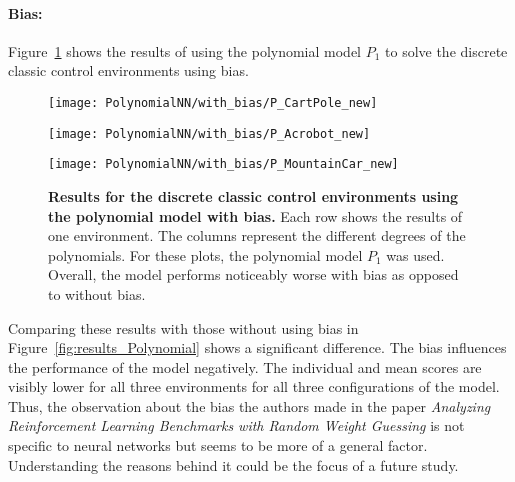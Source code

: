 \paragraph*{Bias:} Figure~\ref{fig:results_Polynomial_bias} shows the results of using the polynomial model $P_1$ to solve the discrete classic control environments using bias.
\begin{figure}[!ht]
  \centering
  \texttt{[image: PolynomialNN/with\_bias/P\_CartPole\_new]}

      \vspace{0.2cm}

  \texttt{[image: PolynomialNN/with\_bias/P\_Acrobot\_new]}

      \vspace{0.2cm}

  \texttt{[image: PolynomialNN/with\_bias/P\_MountainCar\_new]}
\caption[Results for the discrete classic control environments using the polynomial model with bias]{
  \textbf{Results for the discrete classic control environments using the polynomial model with bias.}
   Each row shows the results of one environment. The columns represent the different degrees of the polynomials. For these plots, the polynomial model $P_1$ was used. Overall, the model performs noticeably worse with bias as opposed to without bias.
}
\label{fig:results_Polynomial_bias}
\end{figure}
Comparing these results with those without using bias in Figure~\ref{fig:results_Polynomial} shows a significant difference. The bias influences the performance of the model negatively. The individual and mean scores are visibly lower for all three environments for all three configurations of the model. Thus, the observation about the bias the authors made in the paper \emph{Analyzing Reinforcement Learning Benchmarks with Random Weight Guessing} is not specific to neural networks but seems to be more of a general factor. Understanding the reasons behind it could be the focus of a future study.

